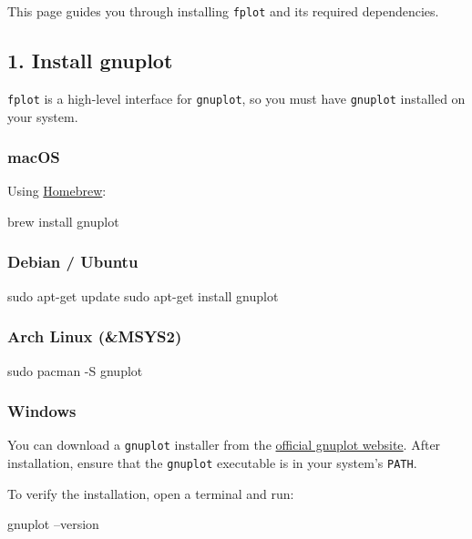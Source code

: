 \documentclass[12pt, letterpaper]{article}
\begin{document}
	This page guides you through installing \texttt{fplot} and its required dependencies.
	
	\subsection{1. Install gnuplot}
	
	\texttt{fplot} is a high-level interface for \texttt{gnuplot}, so you must have \texttt{gnuplot} installed on your system.
	
	\subsubsection*{macOS}
	
	Using \href{https://brew.sh/}{Homebrew}:
	
	\begin{bashcode}
brew install gnuplot
	\end{bashcode}
	
	\subsubsection*{Debian / Ubuntu}
	
	\begin{bashcode}
sudo apt-get update
sudo apt-get install gnuplot
	\end{bashcode}
	
	\subsubsection*{Arch Linux (\&MSYS2)}
	
	\begin{bashcode}
sudo pacman -S gnuplot
	\end{bashcode}
	
	\subsubsection*{Windows}
	
	You can download a \texttt{gnuplot} installer from the \href{http://www.gnuplot.info/download.html}{official gnuplot website}. After installation, ensure that the \texttt{gnuplot} executable is in your system's \texttt{PATH}.
	
	To verify the installation, open a terminal and run:
	
	\begin{bashcode}
gnuplot --version
	\end{bashcode}
	
\end{document}
